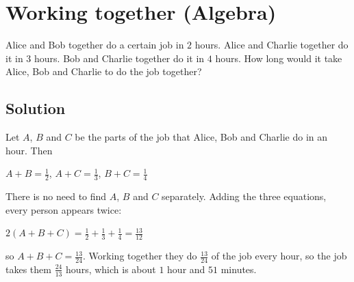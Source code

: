 \section {Working together (Algebra)}

Alice and Bob together do a certain job in $2$ hours.
Alice and Charlie together do it in $3$ hours.
Bob and Charlie together do it in $4$ hours.
How long would it take Alice, Bob and Charlie to do the job together?

\subsection{Solution}

Let $A$, $B$ and $C$ be the parts of the job that Alice, Bob and Charlie do in an hour. Then
\begin{center}
$A+B = \frac{1}{2}$, \quad $A+C = \frac{1}{3}$, \quad $B+C = \frac{1}{4}$
\end{center}
There is no need to find $A$, $B$ and $C$ separately. Adding the three equations, every person appears twice:
\begin{center}
$2(A+B+C) = \frac{1}{2} + \frac{1}{3} + \frac{1}{4} = \frac{13}{12}$
\end{center}
so $A+B+C = \frac{13}{24}$. Working together they do $\frac{13}{24}$ of the job every hour, so the job takes them
$\frac{24}{13}$ hours, which is about $1$ hour and $51$ minutes.
